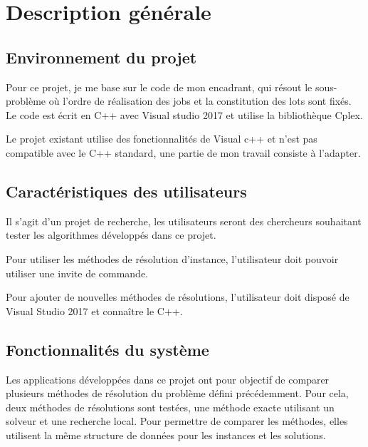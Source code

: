 \chapter{Description générale}

\section{Environnement du projet}
Pour ce projet, je me base sur le code de mon encadrant, qui résout le sous-problème où l'ordre de réalisation des jobs et la constitution des lots sont fixés.
Le code est écrit en C++ avec Visual studio 2017 et utilise la bibliothèque Cplex.

Le projet existant utilise des fonctionnalités de Visual c++ et n'est pas compatible avec le C++ standard,
 une partie de mon travail consiste à l'adapter.
\section{Caractéristiques des utilisateurs}
Il s'agit d'un projet de recherche, les utilisateurs seront des chercheurs souhaitant tester les algorithmes développés dans ce projet.

Pour utiliser les méthodes de résolution d'instance, 
l'utilisateur doit pouvoir utiliser une invite de commande.

Pour ajouter de nouvelles méthodes de résolutions,
l'utilisateur doit disposé de Visual Studio 2017 et connaître le C++.

\section{Fonctionnalités du système}
Les applications développées dans ce projet ont pour objectif de comparer plusieurs méthodes de résolution du problème défini précédemment.
Pour cela, deux méthodes de résolutions sont testées, une méthode exacte utilisant un solveur et une recherche local.
Pour permettre de comparer les méthodes, elles utilisent la même structure de données pour les instances et les solutions.

